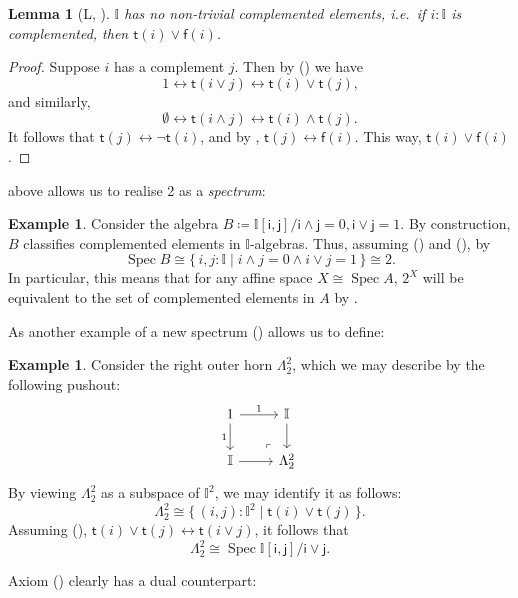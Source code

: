 \documentclass[a4paper,12pt]{amsart}
\newtheorem{lemma}[theorem]{Lemma}
\theoremstyle{definition}
\newtheorem{example}[theorem]{Example}
\newcommand{\mbb}[1]{\mathbb{#1}}
\newcommand{\I}{\mbb I}
\newcommand{\ms}[1]{\mathsf{#1}}
\newcommand{\scomp}[2]{\{\,#1\mid#2\,\}}
\newcommand{\emp}{\emptyset}
\newcommand{\eq}{\leftrightarrow}
\newcommand{\spec}{\operatorname{Spec}}
\newcommand\istsym{\ms{t}}
\newcommand\isfsym{\ms{f}}
\newcommand\ist[1]{\istsym(#1)}
\newcommand\isf[1]{\isfsym(#1)}
\begin{document}
\begin{lemma}[L, \AxiomSQCI]\label{lem:intisnotBoolean}
  $\I$ has no non-trivial complemented elements, i.e.\ if $i : \I$ is complemented, then $\ist{i} \vee \isf{i}$. 
\end{lemma}
\begin{proof}
  Suppose $i$ has a complement $j$. Then by (\AxiomL) we have
  \[ 1 \eq \ist{i\vee j} \eq \ist{i} \vee \ist{j}\text{,} \]
  and similarly,
  \[ \emp \eq \ist{i\wedge j} \eq \ist{i} \wedge \ist{j}\text{.} \]
  It follows that $\ist{j} \eq \neg \ist{i}$, and by , $\ist{j} \eq \isf{i}$. This way, $\ist{i} \vee \isf{i}$.
\end{proof}

 above allows us to realise 2 as a \emph{spectrum}:

\begin{example}\label{exm:2isaffine}
  Consider the algebra $B \coloneq \I[\ms{i},\ms{j}]/{\ms{i}\wedge \ms{j} =0,\ms{i}\vee \ms{j} = 1}$. By construction, $B$ classifies complemented elements in $\I$-algebras. Thus, assuming (\AxiomL) and (\AxiomSQCI), by 
  \[ \spec B \cong \scomp{i,j : \I}{i \wedge j = 0 \wedge i \vee j = 1} \cong 2\text{.} \]
  In particular, this means that for any affine space $X \cong \spec A$, $2^X$ will be equivalent to the set of complemented elements in $A$ by .
\end{example}

As another example of a new spectrum (\AxiomL) allows us to define:

\begin{example}\label{exm:hornaffine}
  Consider the right outer horn $\Lambda^2_2$, which we may describe by the following pushout:
  \[
    \begin{tikzcd}
      1 \ar[d, "1"'] \ar[r, "1"] & \I \ar[d] \\
      \I \ar[r] & \Lambda^2_2
      \arrow["\lrcorner"{anchor=center, pos=0.125, rotate=180}, draw=none, from=2-2, to=1-1]
    \end{tikzcd}
  \]
  By viewing $\Lambda^2_2$ as a subspace of $\I^2$, we may identify it as follows:
  \[ \Lambda^2_2 \cong \scomp{(i,j) : \I^2}{\ist{i} \vee \ist{j}}\text{.} \]
  Assuming (\AxiomL), $\ist{i} \vee \ist{j} \eq \ist{i\vee j}$, it follows that 
  \[ \Lambda^2_2 \cong \spec \I[\ms{i},\ms{j}]/\ms{i} \vee \ms{j}\text{.} \]
\end{example}

Axiom (\AxiomL) clearly has a dual counterpart:
\end{document}
